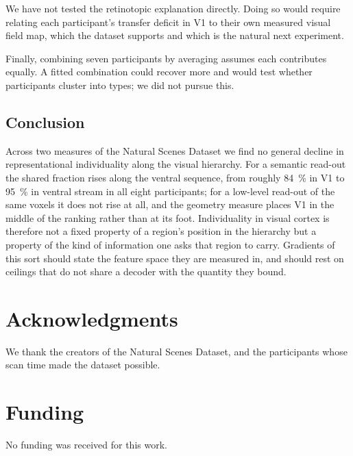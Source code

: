 \documentclass[11pt,a4paper]{article}
\begin{document}
We have not tested the retinotopic explanation directly. Doing so would require
relating each participant's transfer deficit in V1 to their own measured visual
field map, which the dataset supports and which is the natural next experiment.

Finally, combining seven participants by averaging assumes each contributes
equally. A fitted combination could recover more and would test whether
participants cluster into types; we did not pursue this.

\subsection{Conclusion}

Across two measures of the Natural Scenes Dataset we find no general decline in
representational individuality along the visual hierarchy. For a semantic
read-out the shared fraction rises along the ventral sequence, from roughly
\SI{84}{\percent} in V1 to \SI{95}{\percent} in ventral stream in all eight
participants; for a low-level read-out of the same voxels it does not rise at
all, and the geometry measure places V1 in the middle of the ranking rather than
at its foot. Individuality in visual cortex is therefore not a fixed property of
a region's position in the hierarchy but a property of the kind of information
one asks that region to carry. Gradients of this sort should state the feature
space they are measured in, and should rest on ceilings that do not share a
decoder with the quantity they bound.

\section*{Acknowledgments}

We thank the creators of the Natural Scenes Dataset, and the participants whose
scan time made the dataset possible.

\section*{Funding}

No funding was received for this work.
\end{document}

